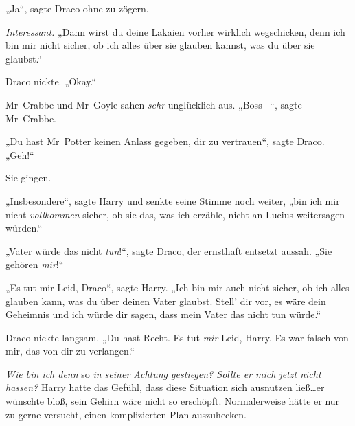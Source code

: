 „Ja“, sagte Draco ohne zu zögern.

\emph{Interessant.} „Dann wirst du deine Lakaien vorher wirklich wegschicken, denn ich bin mir nicht sicher, ob ich alles über sie glauben kannst, was du über sie glaubst.“

Draco nickte. „Okay.“

Mr~Crabbe und Mr~Goyle sahen \emph{sehr} unglücklich aus. „Boss –“, sagte Mr~Crabbe.

„Du hast Mr~Potter keinen Anlass gegeben, dir zu vertrauen“, sagte Draco. „Geh!“

Sie gingen.

„Insbesondere“, sagte Harry und senkte seine Stimme noch weiter, „bin ich mir nicht \emph{vollkommen} sicher, ob sie das, was ich erzähle, nicht an Lucius weitersagen würden.“

„Vater würde das nicht \emph{tun}!“, sagte Draco, der ernsthaft entsetzt aussah. „Sie gehören \emph{mir}!“

„Es tut mir Leid, Draco“, sagte Harry. „Ich bin mir auch nicht sicher, ob ich alles glauben kann, was du über deinen Vater glaubst. Stell’ dir vor, es wäre dein Geheimnis und ich würde dir sagen, dass mein Vater das nicht tun würde.“

Draco nickte langsam. „Du hast Recht. Es tut \emph{mir} Leid, Harry. Es war falsch von mir, das von dir zu verlangen.“

\emph{Wie bin ich denn} so \emph{in seiner Achtung gestiegen? Sollte er mich jetzt nicht hassen?} Harry hatte das Gefühl, dass diese Situation sich ausnutzen ließ…er wünschte bloß, sein Gehirn wäre nicht so erschöpft. Normalerweise hätte er nur zu gerne versucht, einen komplizierten Plan auszuhecken.


